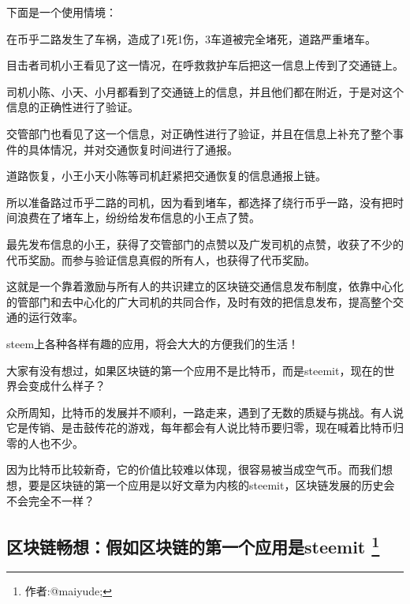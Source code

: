 \documentclass[]{ctexbook}
\begin{document}
下面是一个使用情境：

在币乎二路发生了车祸，造成了1死1伤，3车道被完全堵死，道路严重堵车。

目击者司机小王看见了这一情况，在呼救救护车后把这一信息上传到了交通链上。

司机小陈、小天、小月都看到了交通链上的信息，并且他们都在附近，于是对这个信息的正确性进行了验证。

交管部门也看见了这一个信息，对正确性进行了验证，并且在信息上补充了整个事件的具体情况，并对交通恢复时间进行了通报。

道路恢复，小王小天小陈等司机赶紧把交通恢复的信息通报上链。

所以准备路过币乎二路的司机，因为看到堵车，都选择了绕行币乎一路，没有把时间浪费在了堵车上，纷纷给发布信息的小王点了赞。

最先发布信息的小王，获得了交管部门的点赞以及广发司机的点赞，收获了不少的代币奖励。而参与验证信息真假的所有人，也获得了代币奖励。

这就是一个靠着激励与所有人的共识建立的区块链交通信息发布制度，依靠中心化的管部门和去中心化的广大司机的共同合作，及时有效的把信息发布，提高整个交通的运行效率。

steem上各种各样有趣的应用，将会大大的方便我们的生活！

大家有没有想过，如果区块链的第一个应用不是比特币，而是steemit，现在的世界会变成什么样子？

众所周知，比特币的发展并不顺利，一路走来，遇到了无数的质疑与挑战。有人说它是传销、是击鼓传花的游戏，每年都会有人说比特币要归零，现在喊着比特币归零的人也不少。

因为比特币比较新奇，它的价值比较难以体现，很容易被当成空气币。而我们想想，要是区块链的第一个应用是以好文章为内核的steemit，区块链发展的历史会不会完全不一样？

\hypertarget{steemit}{%
\subsection[区块链畅想：假如区块链的第一个应用是steemit ]{\texorpdfstring{区块链畅想：假如区块链的第一个应用是steemit \footnote{作者:@maiyude;}}{区块链畅想：假如区块链的第一个应用是steemit }}\label{steemit}}
\end{document}
